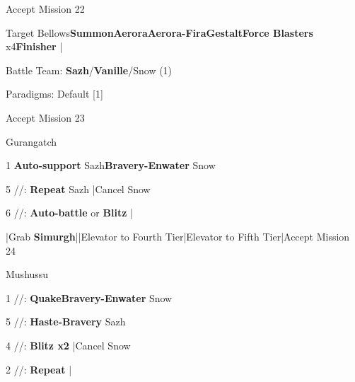 \begin{mainlist}
	\item Accept Mission 22
	\item {} Target Bellows\to \textbf{Summon}\to \textbf{Aerora}\to \textbf{Aerora-Fira}\to \textbf{Gestalt}\to \textbf{Force Blasters} x4\to \textbf{Finisher} |\skip
\end{mainlist}
\begin{menu}
	\item Battle Team: \textbf{Sazh}/\textbf{Vanille}/Snow (1)
	\item Paradigms: Default [1]
\end{menu}
\begin{mainlist}
	\item Accept Mission 23
\end{mainlist}
\begin{fight}{Gurangatch}
	\item [1] \textbf{Auto-support} Sazh\to \textbf{Bravery-Enwater} Snow
	\item [5] \syn/\sab/\com: \textbf{Repeat} Sazh |Cancel Snow
	\item [6] \com/\rav/\com: \textbf{Auto-battle} or \textbf{Blitz} |\skip
\end{fight}
\begin{mainlist}
	\item \skip|Grab \textbf{Simurgh}|\skip|Elevator to Fourth Tier|Elevator to Fifth Tier|Accept Mission 24
\end{mainlist}
\begin{fight}{Mushussu}
	\item [1] \syn/\sab/\rav: \textbf{Quake}\to \textbf{Bravery-Enwater} Snow
	\item [5] \syn/\sab/\com: \textbf{Haste-Bravery} Sazh
	\item [4] \com/\sab/\com: \textbf{Blitz x2} |Cancel Snow
	\item [2] \com/\med/\com: \textbf{Repeat} |\skip
\end{fight}
